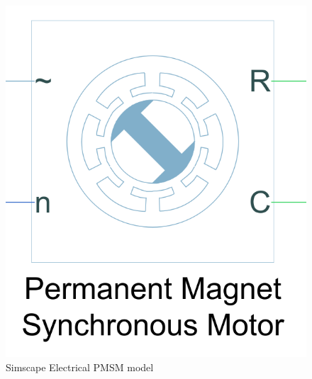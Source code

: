 \begin{figure}[htb]
\begingroup
\tikzset{}
 \centerline{\includegraphics[width=.15\columnwidth]{.//Figure/pmsm_simulink.png}}
 \endgroup
 \caption{Simscape Electrical PMSM model}
 \label{fig:pmsm_simulink}
\end{figure}